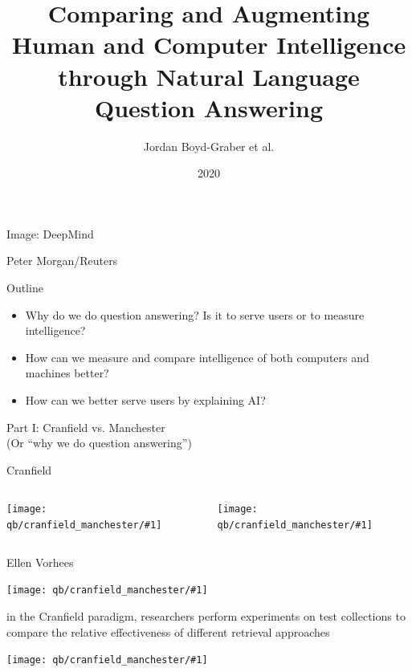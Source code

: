 \documentclass[xcolor=dvipsnames,xcolor=table]{beamer}
\title[HCQA]{Comparing and Augmenting Human and Computer Intelligence through Natural Language Question Answering}
\author{Jordan Boyd-Graber et al.}
\date{2020}
\newcommand{\fsi}[2]{
\begin{frame}[plain]
\vspace*{-1pt}
\makebox[\linewidth]{\texttt{[image: \#1]}}
\begin{center}
#2
\end{center}
\end{frame}
}
\newcommand{\gfxcm}[2]{
\begin{center}
	\texttt{[image: qb/cranfield\_manchester/\#1]}
\end{center}
}
\begin{document}
\begin{frame}
  \titlepage{} 
\end{frame}

\fsi{qb/starcraft}{Image: DeepMind}
\fsi{qb/DeepBlue}{Peter Morgan/Reuters}

\begin{frame}{Outline}

  \begin{itemize}
  \item Why do we do question answering?  Is it to \alert<2,5>{serve users} or to \alert<3,4>{measure intelligence}?
  \item \alert<4>{How can we measure and compare intelligence of both computers and machines better?}
    \item \alert<5>{How can we better serve users by explaining AI?}
  \end{itemize}

\end{frame}


\begin{frame}{}
  \huge Part I: Cranfield vs. Manchester \\
  (Or ``why we do question answering'')
\end{frame}


\begin{frame}{Cranfield}

  \begin{columns}
    \gfxcm{Cranfield_University_Arms_2007}{0.7}
    \gfxcm{Cranfield_University_from_the_air}{1.0}
  \end{columns}
  
\end{frame}

\begin{frame}{Ellen Vorhees}

  \gfxcm{ellen_voorhees}{.35}
  
  \begin{block}{}
in the Cranfield paradigm, researchers perform experiments on test
collections to compare the relative effectiveness of different
retrieval approaches
  \end{block}
  
\end{frame}

\begin{frame}{}

  \gfxcm{nq}{1.0}
  
\end{frame}
\end{document}
